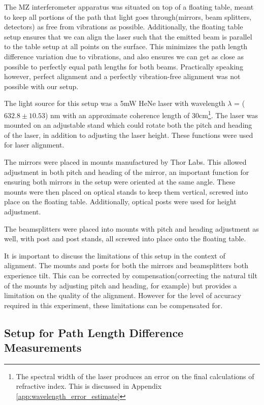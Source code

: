 \documentclass{article}
\newcommand{\sig}[3]{($\num{#1} \pm #2$) \si{#3}}
\begin{document}
The MZ interferometer apparatus was situated on top of a floating table, meant to keep all portions of the path that light goes through(mirrors, beam splitters, detectors) as free from vibrations as possible. Additionally, the floating table setup ensures that we can align the laser such that the emitted beam is parallel to the table setup at all points on the surface. This minimizes the path length difference variation due to vibrations, and also ensures we can get as close as possible to perfectly equal path lengths for both beams. Practically speaking however, perfect alignment and a perfectly vibration-free alignment was not possible with our setup.
\par
The light source for this setup was a 5mW HeNe laser with wavelength $\lambda$ = \sig{632.8}{10.53}{\nano \m} with an approximate coherence length of 30cm\cite{thorlabs.com_tutorials}\footnote{The spectral width of the laser produces an error on the final calculations of refractive index. This is discussed in Appendix \ref{app:wavelength_error_estimate}}. The laser was mounted on an adjustable stand which could rotate both the pitch and heading of the laser, in addition to adjusting the laser height. These functions were used for laser alignment.
\par
The mirrors were placed in mounts manufactured by Thor Labs. This allowed adjustment in both pitch and heading of the mirror, an important function for ensuring both mirrors in the setup were oriented at the same angle. These mounts were then placed on optical stands to keep them vertical, screwed into place on the floating table.
Additionally, optical posts were used for height adjustment.
\par
The beamsplitters were placed into mounts with pitch and heading adjustment as well, with post and post stands, all screwed into place onto the floating table.
\par
It is important to discuss the limitations of this setup in the context of alignment. The mounts and posts for both the mirrors and beamsplitters both experience tilt. This can be corrected by compensation(correcting the natural tilt of the mounts by adjusting pitch and heading, for example) but provides a limitation on the quality of the
alignment. However for the level of accuracy required in this experiment, these limitations can be compensated for.

\subsection{ Setup for Path Length Difference Measurements }\label{sec:setup_for_path_length_difference_measurements}
\end{document}
